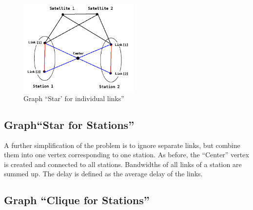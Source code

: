 \documentclass{ifacconf}
\begin{document}


\begin{figure}
\begin{center}
\includegraphics[width=6cm]{graph_star.png}
 \caption{\label{fig:graph_star}  Graph ``Star' for individual
links''}
\end{center}
\end{figure}


\subsection{Graph``Star  for Stations''}\label{subsec:basestar}

A further simplification of the problem is to ignore
separate links, but combine them into one vertex corresponding to
one station. As before, the ``Center'' vertex is created and
connected to all stations. Bandwidths of all links
of a station are summed up. The delay is defined as the average delay of the links.


\subsection{ Graph ``Clique  for Stations''}\label{subsec:baseclique}
\end{document}
